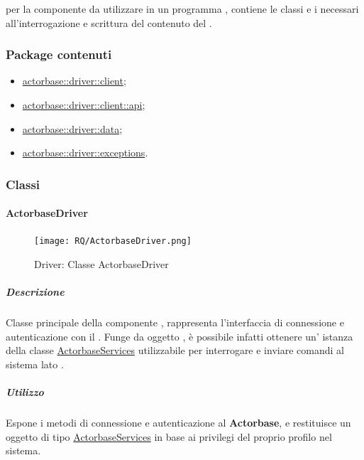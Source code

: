 \documentclass{scalatekids-article}
\begin{document}
 per la componente  da utilizzare in un programma
, contiene le classi e i  necessari all'interrogazione
e scrittura del contenuto del .

\subsubsection{Package contenuti}

\begin{itemize}
\item \hyperref[sec:actorbase::driver::client]{actorbase::driver::client};
\item \hyperref[sec:actorbase::driver::client::api]{actorbase::driver::client::api};
\item \hyperref[sec:actorbase::driver::data]{actorbase::driver::data};
\item \hyperref[sec:actorbase::driver::exceptions]{actorbase::driver::exceptions}.
\end{itemize}

\subsubsection{Classi}

\paragraph{ActorbaseDriver}
\label{sec:actorbase::driver::ActorbaseDriver}

\begin{figure}[H]
  \begin{center}
    \texttt{[image: RQ/ActorbaseDriver.png]}
    \caption{Driver: Classe ActorbaseDriver}
  \end{center}
\end{figure}

\subparagraph{Descrizione}

Classe principale della componente , rappresenta l'interfaccia di
connessione e autenticazione con il . Funge da oggetto
, è possibile infatti ottenere un' istanza della classe
\hyperref[sec:actorbase::driver::ActorbaseServices]{ActorbaseServices}
utilizzabile per interrogare e inviare comandi al sistema lato .

\subparagraph{Utilizzo}

Espone i metodi di connessione e autenticazione al 
\textbf{Actorbase}, e restituisce un oggetto di tipo
\hyperref[sec::actorbase::driver::ActorbaseServices]{ActorbaseServices} in base
ai privilegi del proprio profilo nel sistema.
\end{document}
